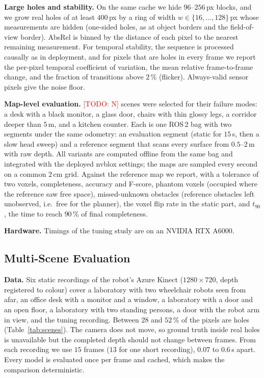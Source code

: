 \documentclass[conference]{IEEEtran}
\newcommand{\todo}[1]{\textcolor{red}{[TODO: #1]}}
\begin{document}
\textbf{Large holes and stability.} On the same cache we hide
\(96\)--\(256\,\)px blocks, and we grow real holes of at least \(400\,\)px by a
ring of width \(w\in\{16,\dots,128\}\,\)px whose measurements are hidden
(one-sided holes, as at object borders and the field-of-view border). AbsRel is
binned by the distance of each pixel to the nearest remaining measurement. For
temporal stability, the sequence is processed causally as in deployment, and
for pixels that are holes in every frame we report the per-pixel temporal
coefficient of variation, the mean relative frame-to-frame change, and the
fraction of transitions above \(2\,\%\) (flicker). Always-valid sensor pixels
give the noise floor.

\textbf{Map-level evaluation.} \todo{N} scenes were selected for their failure
modes: a desk with a black monitor, a glass door, chairs with thin glossy
legs, a corridor deeper than \(5\,\)m, and a kitchen counter. Each is one ROS\,2
bag with two segments under the same odometry: an evaluation segment (static
for \(15\,\)s, then a slow head sweep) and a reference segment that scans every
surface from \(0.5\)--\(2\,\)m with raw depth. All variants are computed
offline from the same bag and integrated with the deployed nvblox settings;
the maps are sampled every second on a common \(2\,\)cm grid. Against the
reference map we report, with a tolerance of two voxels, completeness,
accuracy and F-score, phantom voxels (occupied where the reference saw free
space), missed-unknown obstacles (reference obstacles left unobserved, i.e.\
free for the planner), the voxel flip rate in the static part, and \(t_{90}\),
the time to reach \(90\,\%\) of final completeness.

\textbf{Hardware.} Timings of the tuning study are on an NVIDIA RTX A6000.

\subsection{Multi-Scene Evaluation}
\label{sec:setup-multi}

\textbf{Data.} Six static recordings of the robot's Azure Kinect
(\(1280{\times}720\), depth registered to colour) cover a laboratory with two
wheelchair robots seen from afar, an office desk with a monitor and a window,
a laboratory with a door and an open floor, a laboratory with two standing
persons, a door with the robot arm in view, and the tuning recording.
Between \(28\) and \(52\,\%\) of the pixels are holes (Table~\ref{tab:scenes}).
The camera does not move, so ground truth inside real holes is unavailable but
the completed depth should not change between frames. From each recording we
use \(15\) frames (\(13\) for one short recording), \(0.07\) to \(0.6\,\)s
apart. Every model is evaluated once per frame and cached, which makes the
comparison deterministic.
\end{document}

